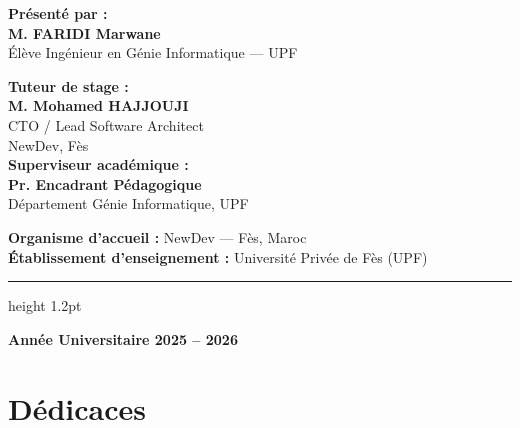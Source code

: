 \documentclass[12pt,a4paper,oneside]{report}
\begin{document}
\begin{titlepage}
\begin{center}
\vspace{1.1cm}

\begin{minipage}[t]{0.48\textwidth}
  \begin{flushleft}
    \textbf{Pr\'esent\'e par :}\\[0.2cm]
    {\large\bfseries M. FARIDI Marwane}\\
    {\small \'Elève Ing\'enieur en G\'enie Informatique --- UPF}
  \end{flushleft}
\end{minipage}
\hfill
\begin{minipage}[t]{0.48\textwidth}
  \begin{flushright}
    \textbf{Tuteur de stage :}\\[0.2cm]
    {\bfseries M. Mohamed HAJJOUJI}\\
    {\small CTO / Lead Software Architect}\\
    {\small NewDev, Fès}\\[0.35cm]
    \textbf{Superviseur acad\'emique :}\\[0.2cm]
    {\bfseries Pr. Encadrant P\'edagogique}\\
    {\small D\'epartement G\'enie Informatique, UPF}
  \end{flushright}
\end{minipage}

\vfill

{\small\textbf{Organisme d'accueil :} NewDev --- Fès, Maroc}\\[0.1cm]
{\small\textbf{\'Etablissement d'enseignement :} Universit\'e Priv\'ee de F\`es (UPF)}\\[0.3cm]
{\color{navyBlue}\hrule height 1.2pt}
\vspace{0.3cm}
{\bfseries Ann\'ee Universitaire 2025 -- 2026}

\end{center}
\end{titlepage}

\setcounter{page}{1}

\chapter*{D\'edicaces}
\thispagestyle{plain}
\end{document}
